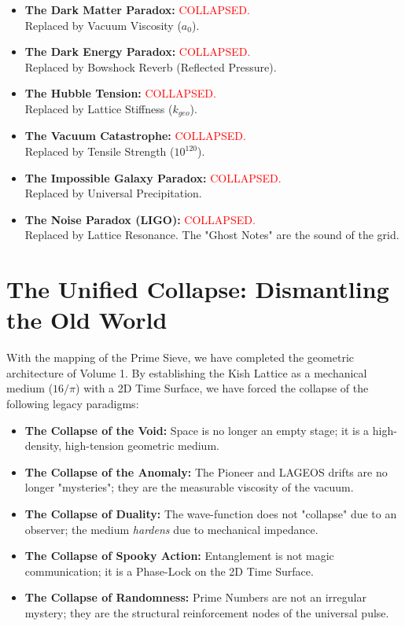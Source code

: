 \documentclass[11pt, letterpaper, openany]{book}
\begin{document}
\begin{itemize}
    \item \textbf{The Dark Matter Paradox:} \textcolor{red}{COLLAPSED.} \\
    Replaced by Vacuum Viscosity ($a_0$).
    
    \item \textbf{The Dark Energy Paradox:} \textcolor{red}{COLLAPSED.} \\
    Replaced by Bowshock Reverb (Reflected Pressure).
    
    \item \textbf{The Hubble Tension:} \textcolor{red}{COLLAPSED.} \\
    Replaced by Lattice Stiffness ($k_{geo}$).
    
    \item \textbf{The Vacuum Catastrophe:} \textcolor{red}{COLLAPSED.} \\
    Replaced by Tensile Strength ($10^{120}$).
    
    \item \textbf{The Impossible Galaxy Paradox:} \textcolor{red}{COLLAPSED.} \\
    Replaced by Universal Precipitation.
    
    \item \textbf{The Noise Paradox (LIGO):} \textcolor{red}{COLLAPSED.} \\
    Replaced by Lattice Resonance. The "Ghost Notes" are the sound of the grid.
\end{itemize}

\section{The Unified Collapse: Dismantling the Old World}
With the mapping of the Prime Sieve, we have completed the geometric architecture of Volume 1. By establishing the Kish Lattice as a mechanical medium ($16/\pi$) with a 2D Time Surface, we have forced the collapse of the following legacy paradigms:

\begin{itemize}
    \item \textbf{The Collapse of the Void:} Space is no longer an empty stage; it is a high-density, high-tension geometric medium.
    \item \textbf{The Collapse of the Anomaly:} The Pioneer and LAGEOS drifts are no longer "mysteries"; they are the measurable viscosity of the vacuum.
    \item \textbf{The Collapse of Duality:} The wave-function does not "collapse" due to an observer; the medium \textit{hardens} due to mechanical impedance.
    \item \textbf{The Collapse of Spooky Action:} Entanglement is not magic communication; it is a Phase-Lock on the 2D Time Surface.
    \item \textbf{The Collapse of Randomness:} Prime Numbers are not an irregular mystery; they are the structural reinforcement nodes of the universal pulse.
\end{itemize}
\end{document}
